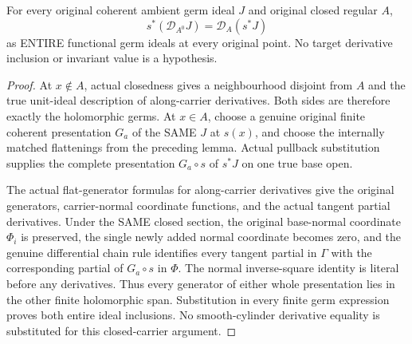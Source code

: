 \begin{theorem}
\label{hir:actual-zero-section-submanifold-whole-derivative}
\leanok
For every original coherent ambient germ ideal $J$ and original closed regular $A$,
\[
 s^*(\mathcal D_{A^0}J)=\mathcal D_A(s^*J)
\]
as ENTIRE functional germ ideals at every original point. No target derivative inclusion or invariant value is a hypothesis.
\end{theorem}
\begin{proof}
At $x\notin A$, actual closedness gives a neighbourhood disjoint from $A$ and the true unit-ideal description of along-carrier derivatives. Both sides are therefore exactly the holomorphic germs. At $x\in A$, choose a genuine original finite coherent presentation $G_a$ of the SAME $J$ at $s(x)$, and choose the internally matched flattenings from the preceding lemma. Actual pullback substitution supplies the complete presentation $G_a\circ s$ of $s^*J$ on one true base open.

The actual flat-generator formulas for along-carrier derivatives give the original generators, carrier-normal coordinate functions, and the actual tangent partial derivatives. Under the SAME closed section, the original base-normal coordinate $\Phi_i$ is preserved, the single newly added normal coordinate becomes zero, and the genuine differential chain rule identifies every tangent partial in $\Gamma$ with the corresponding partial of $G_a\circ s$ in $\Phi$. The normal inverse-square identity is literal before any derivatives. Thus every generator of either whole presentation lies in the other finite holomorphic span. Substitution in every finite germ expression proves both entire ideal inclusions. No smooth-cylinder derivative equality is substituted for this closed-carrier argument.
\end{proof}

